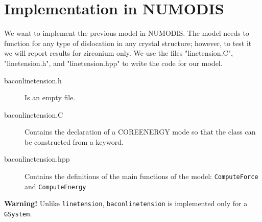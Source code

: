\documentclass[10pt,a4paper,final]{article}
\begin{document}
\section{Implementation in NUMODIS}
We want to implement the previous model in NUMODIS. The model needs to function for any type of dislocation in any crystal structure; however, to test it we will report results for zirconium only. We use the files "linetension.C", "linetension.h", and "linetension.hpp" to write the code for our model.

\begin{description}
\item[baconlinetension.h] Is an empty file.
\item[baconlinetension.C] Contains the declaration of a COREENERGY mode so that the class can be constructed from a keyword.
\item[baconlinetension.hpp] Contains the definitions of the main functions of the model: \texttt{ComputeForce} and \texttt{ComputeEnergy}
\end{description}
\textbf{Warning!} Unlike \texttt{linetension}, \texttt{baconlinetension} is implemented only for a \texttt{GSystem}.
\end{document}
